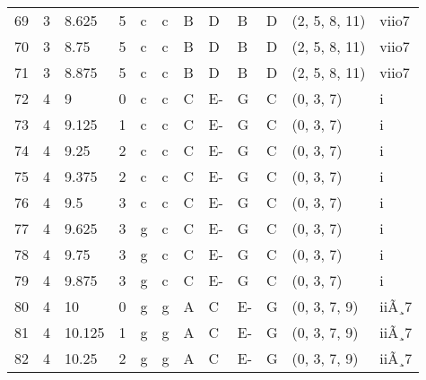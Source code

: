 \begin{tabular}{llllllllllll}
69  & 3       & 8.625  & 5               & c          & c              & B      & D       & B      & D         & (2, 5, 8, 11)    & viio7          \\
70  & 3       & 8.75   & 5               & c          & c              & B      & D       & B      & D         & (2, 5, 8, 11)    & viio7          \\
71  & 3       & 8.875  & 5               & c          & c              & B      & D       & B      & D         & (2, 5, 8, 11)    & viio7          \\
72  & 4       & 9      & 0               & c          & c              & C      & E-      & G      & C         & (0, 3, 7)        & i              \\
73  & 4       & 9.125  & 1               & c          & c              & C      & E-      & G      & C         & (0, 3, 7)        & i              \\
74  & 4       & 9.25   & 2               & c          & c              & C      & E-      & G      & C         & (0, 3, 7)        & i              \\
75  & 4       & 9.375  & 2               & c          & c              & C      & E-      & G      & C         & (0, 3, 7)        & i              \\
76  & 4       & 9.5    & 3               & c          & c              & C      & E-      & G      & C         & (0, 3, 7)        & i              \\
77  & 4       & 9.625  & 3               & g          & c              & C      & E-      & G      & C         & (0, 3, 7)        & i              \\
78  & 4       & 9.75   & 3               & g          & c              & C      & E-      & G      & C         & (0, 3, 7)        & i              \\
79  & 4       & 9.875  & 3               & g          & c              & C      & E-      & G      & C         & (0, 3, 7)        & i              \\
80  & 4       & 10     & 0               & g          & g              & A      & C       & E-     & G         & (0, 3, 7, 9)     & iiÃ¸7          \\
81  & 4       & 10.125 & 1               & g          & g              & A      & C       & E-     & G         & (0, 3, 7, 9)     & iiÃ¸7          \\
82  & 4       & 10.25  & 2               & g          & g              & A      & C       & E-     & G         & (0, 3, 7, 9)     & iiÃ¸7          \\

\end{tabular}
